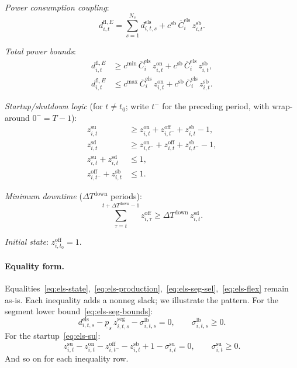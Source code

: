 \documentclass[11pt]{article}
\theoremstyle{definition}
\begin{document}
\emph{Power consumption coupling}:
\begin{equation}
d^{\mathrm{fl},E}_{i,t}=\sum_{s=1}^{N_s}d^{\mathrm{els}}_{i,t,s}
  +c^{\mathrm{sb}}\,\overline{C}^{\mathrm{els}}_i\,z^{\mathrm{sb}}_{i,t}.
\label{eq:els-flex}
\end{equation}

\emph{Total power bounds}:
\begin{align}
d^{\mathrm{fl},E}_{i,t}&\ge c^{\min}\,\overline{C}^{\mathrm{els}}_i\,
  z^{\mathrm{on}}_{i,t}
  +c^{\mathrm{sb}}\,\overline{C}^{\mathrm{els}}_i\,z^{\mathrm{sb}}_{i,t},
\label{eq:els-min-total}\\
d^{\mathrm{fl},E}_{i,t}&\le c^{\max}\,\overline{C}^{\mathrm{els}}_i\,
  z^{\mathrm{on}}_{i,t}
  +c^{\mathrm{sb}}\,\overline{C}^{\mathrm{els}}_i\,z^{\mathrm{sb}}_{i,t}.
\label{eq:els-max-total}
\end{align}

\emph{Startup/shutdown logic} (for $t\neq t_0$; write $t^{-}$ for the
preceding period, with wrap-around $0^{-}=T{-}1$):
\begin{align}
z^{\mathrm{su}}_{i,t}&\ge z^{\mathrm{on}}_{i,t}
  +z^{\mathrm{off}}_{i,t^-}+z^{\mathrm{sb}}_{i,t}-1,
\label{eq:els-su}\\
z^{\mathrm{sd}}_{i,t}&\ge z^{\mathrm{on}}_{i,t^-}
  +z^{\mathrm{off}}_{i,t}+z^{\mathrm{sb}}_{i,t^-}-1,
\label{eq:els-sd}\\
z^{\mathrm{su}}_{i,t}+z^{\mathrm{sd}}_{i,t}&\le1,
\label{eq:els-conflict}\\
z^{\mathrm{off}}_{i,t^-}+z^{\mathrm{sb}}_{i,t}&\le1.
\label{eq:els-off-sb}
\end{align}

\emph{Minimum downtime} ($\Delta T^{\mathrm{down}}$ periods):
\begin{equation}
\sum_{\tau=t}^{t+\Delta T^{\mathrm{down}}-1}z^{\mathrm{off}}_{i,\tau}
  \ge\Delta T^{\mathrm{down}}\,z^{\mathrm{sd}}_{i,t}.
\label{eq:els-mindown}
\end{equation}

\emph{Initial state}: $z^{\mathrm{off}}_{i,t_0}=1$.

\paragraph{Equality form.}

Equalities~\eqref{eq:els-state},~\eqref{eq:els-production},~\eqref{eq:els-seg-sel},~\eqref{eq:els-flex}
remain as-is.  Each inequality adds a nonneg slack; we illustrate the
pattern.  For the segment lower bound~\eqref{eq:els-seg-bounds}:
\begin{equation}
d^{\mathrm{els}}_{i,t,s}-\underline{p}_s\,z^{\mathrm{seg}}_{i,t,s}
  -\sigma^{\mathrm{lb}}_{i,t,s}=0,
\qquad\sigma^{\mathrm{lb}}_{i,t,s}\ge0.
\label{eq:els-seg-lb-eq}
\end{equation}
For the startup~\eqref{eq:els-su}:
\begin{equation}
z^{\mathrm{su}}_{i,t}-z^{\mathrm{on}}_{i,t}
-z^{\mathrm{off}}_{i,t^-}-z^{\mathrm{sb}}_{i,t}+1
-\sigma^{\mathrm{su}}_{i,t}=0,
\qquad\sigma^{\mathrm{su}}_{i,t}\ge0.
\label{eq:els-su-eq}
\end{equation}
And so on for each inequality row.
\end{document}
